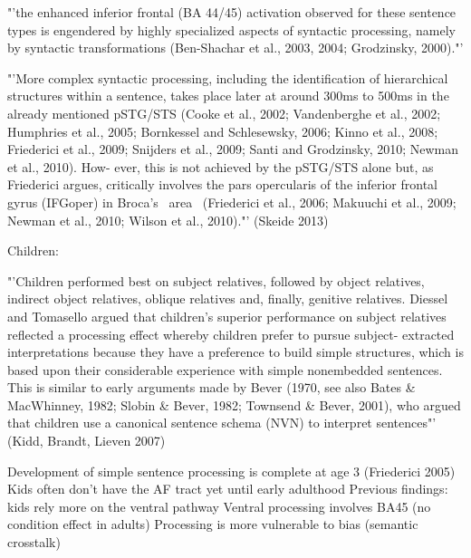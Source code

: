 "'the enhanced inferior frontal (BA 44/45) activation observed for these sentence types is engendered by highly specialized aspects of syntactic processing, namely by syntactic transformations (Ben-Shachar et al., 2003, 2004; Grodzinsky, 2000)."'

 "'More complex syntactic processing, 
 including the identification of hierarchical structures within a sentence, takes 
 place later at around 300ms to 500ms in the already mentioned pSTG/STS 
 (Cooke et al., 2002; Vandenberghe et al., 2002; Humphries et al., 2005; 
 Bornkessel and Schlesewsky, 2006; Kinno et al., 2008; Friederici et al., 2009; 
 Snijders et al., 2009; Santi and Grodzinsky, 2010; Newman et al., 2010). How-
 ever, this is not achieved by the pSTG/STS alone but, as Friederici argues, 
 critically involves the pars opercularis of the inferior frontal gyrus (IFGoper) in 
 Broca's  area  (Friederici et al., 2006; Makuuchi et al., 2009; Newman et al., 
 2010; Wilson et al., 2010)."' (Skeide 2013)

Children:

"'Children
 performed best on subject relatives, followed by object relatives, indirect
 object relatives, oblique relatives and, finally, genitive relatives. Diessel and
 Tomasello argued that children's superior performance on subject relatives
 reflected a processing effect whereby children prefer to pursue subject-
 extracted interpretations because they have a preference to build simple
 structures, which is based upon their considerable experience with simple
 nonembedded sentences. This is similar to early arguments made by Bever
 (1970, see also Bates \& MacWhinney, 1982; Slobin \& Bever, 1982; Townsend
 \& Bever, 2001), who argued that children use a canonical sentence schema
 (NVN) to interpret sentences"' (Kidd, Brandt, Lieven 2007)

Development of simple sentence processing is complete at age 3 (Friederici 2005)
Kids often don't have the AF tract yet until early adulthood
Previous findings: kids rely more on the ventral pathway
Ventral processing involves BA45 (no condition effect in adults)
Processing is more vulnerable to bias (semantic crosstalk)


